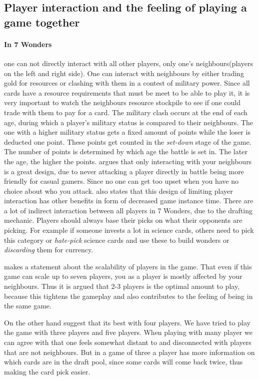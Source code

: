 \documentclass[a4paper]{article}
\begin{document}
\subsection{Player interaction and the feeling of playing a game together}
\paragraph{In 7 Wonders} one can not directly interact with all other players, only one's neighbours(players on the left and right side).
One can interact with neighbours by either trading gold for resources or clashing with them in a contest of military power.
Since all cards have a resource requirements that must be meet to be able to play it, it is very important to watch the neighbours resource stockpile to see if one could trade with them to pay for a card.
The military clash occurs at the end of each age, during which a player's military status is compared to their neighbours.
The one with a higher military status gets a fixed amount of points while the loser is deducted one point.
These points get counted in the \textit{set-down} stage of the game. The number of points is determined by which age the battle is set in.
The later the age, the higher the points. 
 argues that only interacting with your neighbours is a great design, due to never attacking a player directly in battle being more friendly for casual gamers. 
Since no one can get too upset when you have no choice about who you attack. \citeauthor{notsacgame7wond} also states that this design of limiting player interaction has other benefits in form of decreased game instance time.
There are a lot of indirect interaction between all players in 7 Wonders, due to the drafting mechanic. Players should always base their picks on what their opponents are picking.
For example if someone invests a lot in science cards, others need to pick this category or \textit{hate-pick} science cards and use these to build wonders or \textit{discarding} them for currency.

 makes a statement about the scalability of players in the game.
That even if this game can scale up to seven players, you as a player is mostly affected by your neighbours.
Thus it is argued that 2-3 players is the optimal amount to play, because this tightens the gameplay and also contributes to the feeling of being in the same game.

On the other hand  suggest that its best with four players.
We have tried to play the game with three players and five players.
When playing with many player we can agree with \citeauthor{critical7wond} that one feels somewhat distant to and disconnected with players that are not neighbours.
But in a game of three a player has more information on which cards are in the draft pool, since some cards will come back twice, thus making the card pick easier. 
\end{document}
